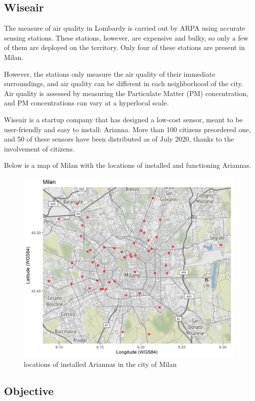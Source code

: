 \documentclass{article}
\begin{document}
\subsection{Wiseair}

The measure of air quality in Lombardy is carried out by ARPA using accurate sensing stations. These stations, however,
 are expensive and bulky, so only a few of them are deployed on the territory. Only four of these stations are present in Milan. 


However, the stations only measure the air quality of their immediate surroundings, and air quality  can be different in each neighborhood
 of the city. Air quality is assessed by measuring the Particulate Matter (PM) concentration, and PM concentrations can vary at a hyperlocal scale.

Wiseair is a startup company that has designed a low-cost sensor, meant to be user-friendly and easy to install: Arianna.
 More than 100 citizens preordered one, and 50 of these sensors have been distributed as of July 2020, thanks to the involvement of citizens.

 Below is a map of Milan with the locations of installed and functioning Ariannas.

\begin{figure}[h!]
  \centering
  \includegraphics[width=5in]{potsMap.jpg}
  \caption{locations of installed Ariannas in the city of Milan}
\end{figure}

\subsection{Objective}
\end{document}
